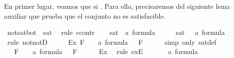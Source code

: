 \begin{isabellebody}
\begin{isamarkuptext}
  En primer lugar, veamos que  si . Para ello, precisaremos del siguiente lema 
  auxiliar que prueba que el conjunto \isa{{\isacharbraceleft}{\isasymbottom}{\isacharbraceright}} no es satisfacible.%
\end{isamarkuptext}\isamarkuptrue%
\isamarkupfalse%
\ not{\isacharunderscore}sat{\isacharunderscore}bot{\isacharcolon}\ {\isachardoublequoteopen}{\isasymnot}\ sat\ {\isacharbraceleft}{\isasymbottom}{\isacharbraceright}{\isachardoublequoteclose}\isanewline
%
\isadelimproof
%
\endisadelimproof
%
\isatagproof
{}\isamarkupfalse%
\ {\isacharparenleft}rule\ ccontr{\isacharparenright}\isanewline
\ \ \isamarkupfalse%
\ {\isachardoublequoteopen}{\isasymnot}{\isacharparenleft}{\isasymnot}sat{\isacharbraceleft}{\isasymbottom}\ {\isacharcolon}{\isacharcolon}\ {\isacharprime}a\ formula{\isacharbraceright}{\isacharparenright}{\isachardoublequoteclose}\isanewline
\ \ \isamarkupfalse%
\ \isamarkupfalse%
\ {\isachardoublequoteopen}sat\ {\isacharbraceleft}{\isasymbottom}\ {\isacharcolon}{\isacharcolon}\ {\isacharprime}a\ formula{\isacharbraceright}{\isachardoublequoteclose}\isanewline
\ \ \ \ \isamarkupfalse%
\ {\isacharparenleft}rule\ notnotD{\isacharparenright}\isanewline
\ \ \isamarkupfalse%
\ \isamarkupfalse%
\ Ex{\isacharcolon}{\isachardoublequoteopen}{\isasymexists}{\isasymA}{\isachardot}\ {\isasymforall}F\ {\isasymin}\ {\isacharbraceleft}{\isasymbottom}\ {\isacharcolon}{\isacharcolon}\ {\isacharprime}a\ formula{\isacharbraceright}{\isachardot}\ {\isasymA}\ {\isasymTurnstile}\ F{\isachardoublequoteclose}\isanewline
\ \ \ \ \isamarkupfalse%
\ {\isacharparenleft}simp\ only{\isacharcolon}\ sat{\isacharunderscore}def{\isacharparenright}\isanewline
\ \ \isamarkupfalse%
\ {\isasymA}\ \ {}{\isacharcolon}{\isachardoublequoteopen}{\isasymforall}F\ {\isasymin}\ {\isacharbraceleft}{\isasymbottom}\ {\isacharcolon}{\isacharcolon}\ {\isacharprime}a\ formula{\isacharbraceright}{\isachardot}\ {\isasymA}\ {\isasymTurnstile}\ F{\isachardoublequoteclose}\isanewline
\ \ \ \ \isamarkupfalse%
\ Ex\ \isamarkupfalse%
\ {\isacharparenleft}rule\ exE{\isacharparenright}\isanewline
\ \ \isamarkupfalse%
\ {}{\isacharcolon}{\isachardoublequoteopen}{\isasymbottom}\ {\isasymin}\ {\isacharbraceleft}{\isasymbottom}{\isacharcolon}{\isacharcolon}\ {\isacharprime}a\ formula{\isacharbraceright}{\isachardoublequoteclose}\isanewline

\end{isabellebody}
